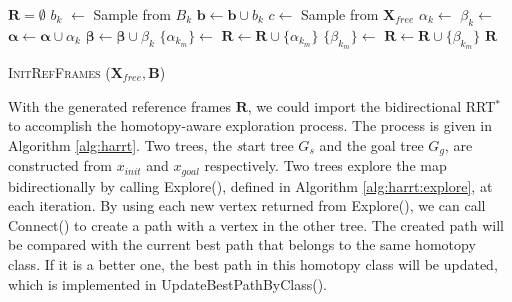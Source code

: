 \documentclass[letterpaper, 10 pt, conference]{ieeeconf}
\begin{document}
\begin{algorithm}[hbtp]
	\begin{algorithmic}[1]
		\State $ \bm{R} = \emptyset $
			\State $ b_{k} $ $ \leftarrow $ Sample from $ B_{k} $
			\State $ \bm{b} \leftarrow \bm{b} \cup b_{k} $
		\EndFor
			\State $ c \leftarrow  $ Sample from $ \bm{X}_{free} $
		\EndWhile
			\State $ \alpha_{k} \leftarrow $ 
			\State $ \beta_{k} \leftarrow $ 
			\State $ \bm{\alpha} \leftarrow \bm{\alpha} \cup \alpha_{k} $
			\State $ \bm{\beta} \leftarrow \bm{\beta} \cup \beta_{k} $			
		\EndFor
			\State $ \{ \alpha_{k_{m}} \} \leftarrow $ 
			\State $ \bm{R} \leftarrow \bm{R} \cup \{ \alpha_{k_{m}} \} $
		\EndFor
			\State $ \{ \beta_{k_{m}} \} \leftarrow $ 
			\State $ \bm{R} \leftarrow \bm{R} \cup \{ \beta_{k_{m}} \} $
		\EndFor
		\Return $ \bm{R} $
	\end{algorithmic}
	\caption{ \textsc{InitRefFrames} ($ \bm{X}_{free} , \bm{B} $) }
	\label{alg:harrt:init_ref_frames}
\end{algorithm} 

With the generated reference frames $ \mathbf{R} $, we could import the bidirectional RRT$^{*}$ to accomplish the homotopy-aware exploration process.
The process is given in Algorithm \ref{alg:harrt}.
Two trees, the {\emph start tree} $ G_{s} $ and the {\sc goal tree} $ G_{g} $, are constructed from $ x_{init} $ and $ x_{goal} $ respectively.
Two trees explore the map bidirectionally by calling {\sc Explore}(), defined in Algorithm \ref{alg:harrt:explore}, at each iteration.
By using each new vertex returned from {\sc Explore}(), we can call {\sc Connect}() to create a path with a vertex in the other tree.
The created path will be compared with the current best path that belongs to the same homotopy class.
If it is a better one, the best path in this homotopy class will be updated, which is implemented in {\sc UpdateBestPathByClass}().
\end{document}
